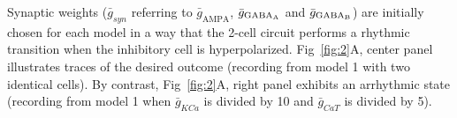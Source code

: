 Synaptic weights ($\bar{g}_{syn}$ referring to $\bar{g}_{\text{AMPA}}$, $\bar{g}_{\text{GABA\textsubscript{A}}}$ and $\bar{g}_{\text{GABA\textsubscript{B}}}$) are initially chosen for each model in a way that the 2-cell circuit performs a rhythmic transition when the inhibitory cell is hyperpolarized. Fig~\ref{fig:2}A, center panel illustrates traces of the desired outcome (recording from model 1 with two identical cells). By contrast, Fig~\ref{fig:2}A, right panel  exhibits an arrhythmic state (recording from model 1 when $\bar{g}_{KCa}$ is divided by 10 and $\bar{g}_{CaT}$ is divided by 5).

